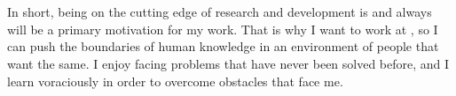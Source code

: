 \\\\
\indent In short, being on the cutting edge of research and development 
is and always will be a primary motivation for my work. That is why I want 
to work at \company, so I can push the boundaries of human knowledge in an
environment of people that want the same. I enjoy facing problems that have 
never been solved before, and I learn voraciously in order to overcome 
obstacles that face me.
